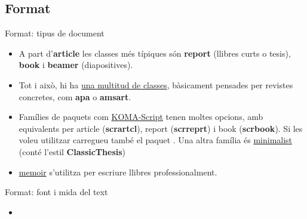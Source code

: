 \subsection{Format}
\begin{frame}[fragile]{Format: tipus de document}
\begin{itemize}
\item A part d'\textbf{article} les classes més típiques són \textbf{report} (llibres curts o tesis), \textbf{book} i \textbf{beamer} (diapositives).
\item Tot i això, hi ha \href{https://ctan.org/topic/class}{una multitud de classes}, bàsicament pensades per revistes concretes, com \textbf{apa} o \textbf{amsart}.
\item Famílies de paquets com \href{https://ctan.org/pkg/koma-script}{KOMA-Script} tenen moltes opcions, amb equivalents per article (\textbf{scrartcl}), report (\textbf{scrreprt}) i book (\textbf{scrbook}). Si les voleu utilitzar carregueu també el paquet . Una altra família és \href{https://ctan.org/pkg/minimalist}{minimalist} (conté l'estil \textbf{ClassicThesis})
\item \href{https://ctan.org/pkg/memoir}{memoir} s'utilitza per escriure llibres professionalment.
\end{itemize}


\end{frame}

\begin{frame}[fragile]{Format: font i mida del text}
\begin{itemize}
\item 
\end{itemize}

\begin{exampletiny}
\end{exampletiny}

\end{frame}

